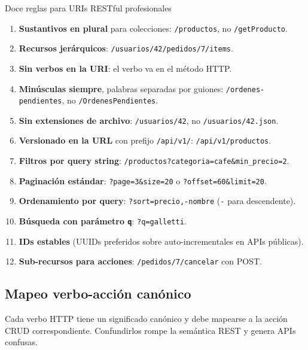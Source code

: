 \documentclass[11pt,a4paper,openany]{book}
\begin{document}
\begin{cajabuenas}{Doce reglas para URIs RESTful profesionales}
\begin{enumerate}
\item \textbf{Sustantivos en plural} para colecciones:
\texttt{/productos}, no \texttt{/getProducto}.
\item \textbf{Recursos jerárquicos}:
\texttt{/usuarios/42/pedidos/7/items}.
\item \textbf{Sin verbos en la URI}: el verbo va en el método HTTP.
\item \textbf{Minúsculas siempre}, palabras separadas por guiones:
\texttt{/ordenes-pendientes}, no \texttt{/OrdenesPendientes}.
\item \textbf{Sin extensiones de archivo}: \texttt{/usuarios/42}, no
\texttt{/usuarios/42.json}.
\item \textbf{Versionado en la URL} con prefijo \texttt{/api/v1/}:
\texttt{/api/v1/productos}.
\item \textbf{Filtros por query string}:
\texttt{/productos?categoria=cafe\&min\_precio=2}.
\item \textbf{Paginación estándar}:
\texttt{?page=3\&size=20} o \texttt{?offset=60\&limit=20}.
\item \textbf{Ordenamiento por query}:
\texttt{?sort=precio,-nombre} (\texttt{-} para descendente).
\item \textbf{Búsqueda con parámetro \texttt{q}}:
\texttt{?q=galletti}.
\item \textbf{IDs estables} (UUIDs preferidos sobre auto-incrementales
en APIs públicas).
\item \textbf{Sub-recursos para acciones}: \texttt{/pedidos/7/cancelar}
con POST.
\end{enumerate}
\end{cajabuenas}

\subsection{Mapeo verbo-acción canónico}

Cada verbo HTTP tiene un significado canónico y debe
mapearse a la acción CRUD correspondiente. Confundirlos rompe la
semántica REST y genera APIs confusas.
\end{document}

